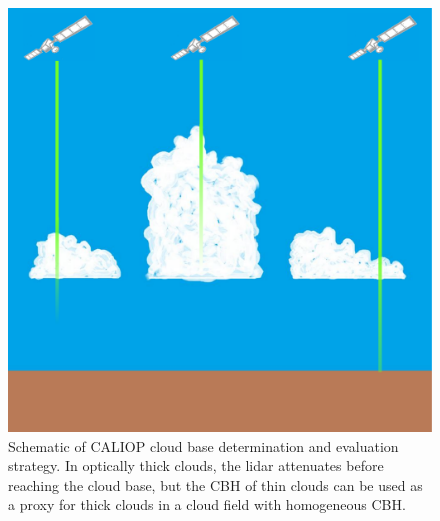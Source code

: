 \documentclass[essd,manuscript]{copernicus}\usepackage[]{graphicx}\usepackage[]{color}
\begin{document}
\begin{figure}
  \centering
  \includegraphics[width=0.5\linewidth,keepaspectratio=true]{CloudFieldCALIOP.pdf}
  \caption{Schematic of CALIOP cloud base determination and evaluation
    strategy.  In optically thick clouds, the lidar attenuates before reaching
    the cloud base, but the CBH of thin clouds can be used as a
    proxy for thick clouds in a cloud field with homogeneous CBH.}
  \label{fig:method}
\end{figure}
\end{document}
